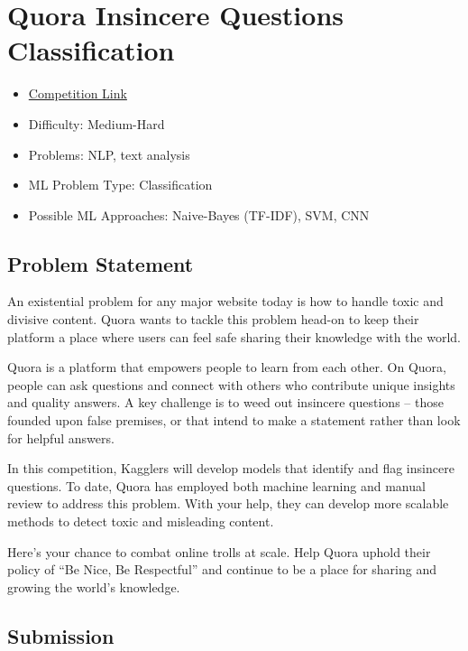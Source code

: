 \documentclass[11pt]{article}
\author{Andrew Chen}
\date{\today}
\title{}
\begin{document}
\tableofcontents

\section{Quora Insincere Questions Classification}
\label{sec:org53fe079}

\begin{itemize}
\item \href{https://www.kaggle.com/c/quora-insincere-questions-classification/data}{Competition Link}
\item Difficulty: Medium-Hard
\item Problems: NLP, text analysis
\item ML Problem Type: Classification
\item Possible ML Approaches: Naive-Bayes (TF-IDF), SVM, CNN
\end{itemize}

\subsection{Problem Statement}
\label{sec:org2c6144f}

An existential problem for any major website today is how to handle toxic and divisive content. Quora wants to tackle this problem head-on to keep their platform a place where users can feel safe sharing their knowledge with the world.

Quora is a platform that empowers people to learn from each other. On Quora, people can ask questions and connect with others who contribute unique insights and quality answers. A key challenge is to weed out insincere questions -- those founded upon false premises, or that intend to make a statement rather than look for helpful answers.

In this competition, Kagglers will develop models that identify and flag insincere questions. To date, Quora has employed both machine learning and manual review to address this problem. With your help, they can develop more scalable methods to detect toxic and misleading content.

Here's your chance to combat online trolls at scale. Help Quora uphold their policy of “Be Nice, Be Respectful” and continue to be a place for sharing and growing the world’s knowledge.


\subsection{Submission}
\label{sec:org7d36aaa}
\end{document}
